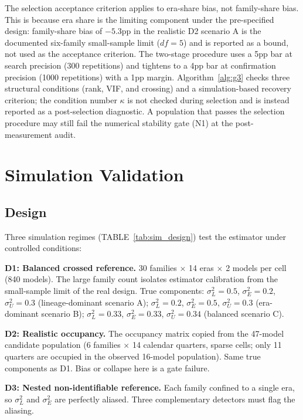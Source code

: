 \documentclass[11pt]{article}
\theoremstyle{definition}
\theoremstyle{plain}
\begin{document}
The selection acceptance criterion applies to era-share bias, not family-share bias. This is because era share is the limiting component under the pre-specified design: family-share bias of $-5.3$pp in the realistic D2 scenario A is the documented six-family small-sample limit ($df = 5$) and is reported as a bound, not used as the acceptance criterion. The two-stage procedure uses a 5pp bar at search precision (300 repetitions) and tightens to a 4pp bar at confirmation precision (1000 repetitions) with a 1pp margin. Algorithm~\ref{alg:g3} checks three structural conditions (rank, VIF, and crossing) and a simulation-based recovery criterion; the condition number $\kappa$ is not checked during selection and is instead reported as a post-selection diagnostic. A population that passes the selection procedure may still fail the numerical stability gate (N1) at the post-measurement audit.

\section{Simulation Validation}
\label{sec:sim}

\subsection{Design}
Three simulation regimes (TABLE~\ref{tab:sim_design}) test the estimator under controlled conditions:

\textbf{D1: Balanced crossed reference.} 30 families $\times$ 14 eras $\times$ 2 models per cell (840 models). The large family count isolates estimator calibration from the small-sample limit of the real design. True components: $\sigma^2_L = 0.5$, $\sigma^2_E = 0.2$, $\sigma^2_U = 0.3$ (lineage-dominant scenario A); $\sigma^2_L = 0.2$, $\sigma^2_E = 0.5$, $\sigma^2_U = 0.3$ (era-dominant scenario B); $\sigma^2_L = 0.33$, $\sigma^2_E = 0.33$, $\sigma^2_U = 0.34$ (balanced scenario C).

\textbf{D2: Realistic occupancy.} The occupancy matrix copied from the 47-model candidate population (6 families $\times$ 14 calendar quarters, sparse cells; only 11 quarters are occupied in the observed 16-model population). Same true components as D1. Bias or collapse here is a gate failure.

\textbf{D3: Nested non-identifiable reference.} Each family confined to a single era, so $\sigma^2_L$ and $\sigma^2_E$ are perfectly aliased. Three complementary detectors must flag the aliasing.
\end{document}
